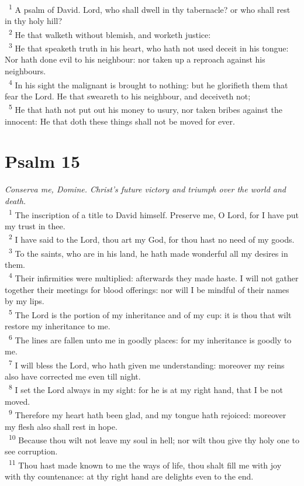 \documentclass[a5paper,12pt]{article}
\begin{document}
\begin{multicols*}{2}
~\textsuperscript{1} A psalm of David. Lord, who shall dwell in thy tabernacle? or who shall rest in thy holy hill?\\
~\textsuperscript{2} He that walketh without blemish, and worketh justice:\\
~\textsuperscript{3} He that speaketh truth in his heart, who hath not used deceit in his tongue: Nor hath done evil to his neighbour: nor taken up a reproach against his neighbours.\\
~\textsuperscript{4} In his sight the malignant is brought to nothing: but he glorifieth them that fear the Lord. He that sweareth to his neighbour, and deceiveth not;\\
~\textsuperscript{5} He that hath not put out his money to usury, nor taken bribes against the innocent: He that doth these things shall not be moved for ever.\\

\section{Psalm 15}
\label{sec:orge17a102}
\emph{Conserva me, Domine. Christ's future victory and triumph over the world and death.}\\

~\textsuperscript{1} The inscription of a title to David himself. Preserve me, O Lord, for I have put my trust in thee.\\
~\textsuperscript{2} I have said to the Lord, thou art my God, for thou hast no need of my goods.\\
~\textsuperscript{3} To the saints, who are in his land, he hath made wonderful all my desires in them.\\
~\textsuperscript{4} Their infirmities were multiplied: afterwards they made haste. I will not gather together their meetings for blood offerings: nor will I be mindful of their names by my lips.\\
~\textsuperscript{5} The Lord is the portion of my inheritance and of my cup: it is thou that wilt restore my inheritance to me.\\
~\textsuperscript{6} The lines are fallen unto me in goodly places: for my inheritance is goodly to me.\\
~\textsuperscript{7} I will bless the Lord, who hath given me understanding: moreover my reins also have corrected me even till night.\\
~\textsuperscript{8} I set the Lord always in my sight: for he is at my right hand, that I be not moved.\\
~\textsuperscript{9} Therefore my heart hath been glad, and my tongue hath rejoiced: moreover my flesh also shall rest in hope.\\
~\textsuperscript{10} Because thou wilt not leave my soul in hell; nor wilt thou give thy holy one to see corruption.\\
~\textsuperscript{11} Thou hast made known to me the ways of life, thou shalt fill me with joy with thy countenance: at thy right hand are delights even to the end.\\


\end{multicols*}
\end{document}
